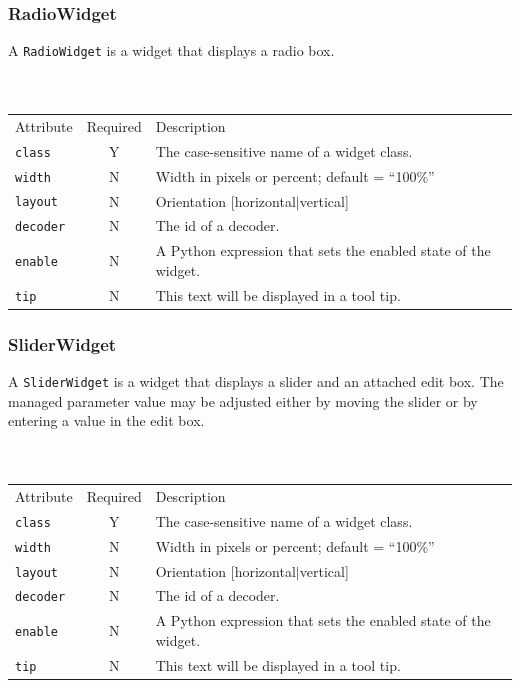 \documentclass[a4paper,twoside,12pt]{article}
\newcommand{\code}[1]{\color{red}\texttt{#1}\color{black}}
\begin{document}
\subsubsection{RadioWidget}
A \code{RadioWidget}{} is a widget that displays a radio box.
\\
\\
\\
\begin{tabular}{|l|c|p{9cm}|}
\hline
Attribute & Required & Description \\
\code{class} & Y & The case-sensitive name of a widget class. \\
\code{width} & N & Width in pixels or percent; default = ``100\%'' \\
\code{layout} & N & Orientation [horizontal$|$vertical] \\
\code{decoder} & N & The id of a decoder. \\
\code{enable} & N & A Python expression that sets the
enabled state of the widget. \\
\code{tip} & N & This text will be displayed in a tool tip. \\
\hline
\end{tabular}

\subsubsection{SliderWidget}
A \code{SliderWidget}{} is a widget that displays a slider and an
attached edit box. The managed parameter value may be adjusted
either by moving the slider or by entering a value in the edit
box.
\\
\\
\\
\begin{tabular}{|l|c|p{9cm}|}
\hline
Attribute & Required & Description \\
\code{class} & Y & The case-sensitive name of a widget class. \\
\code{width} & N & Width in pixels or percent; default = ``100\%'' \\
\code{layout} & N & Orientation [horizontal$|$vertical] \\
\code{decoder} & N & The id of a decoder. \\
\code{enable} & N & A Python expression that sets the
enabled state of the widget. \\
\code{tip} & N & This text will be displayed in a tool tip. \\
\hline
\end{tabular}
\end{document}
